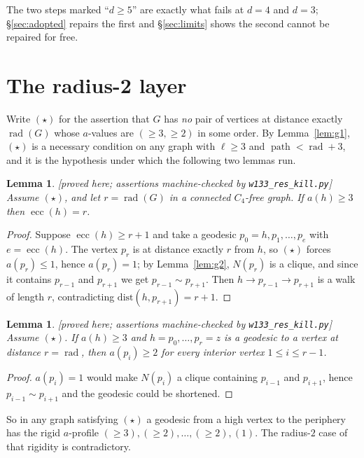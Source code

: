 \documentclass[11pt]{article}
\theoremstyle{plain}
\newtheorem{lemma}[theorem]{Lemma}
\theoremstyle{definition}
\theoremstyle{remark}
\numberwithin{equation}{section}
\newcommand{\rad}{\operatorname{rad}}
\newcommand{\ecc}{\operatorname{ecc}}
\newcommand{\pth}{\operatorname{path}}
\newcommand{\statusbox}[1]{{\small\sloppy\textsf{[#1]}}}
\newcommand{\PRV}[1]{\statusbox{proved here; assertions machine-checked by \texttt{#1}}}
\begin{document}
The two steps marked ``$d \ge 5$'' are exactly what fails at $d = 4$ and $d = 3$;
\S\ref{sec:adopted} repairs the first and \S\ref{sec:limits} shows the second cannot be
repaired for free.

\section{The radius-2 layer}\label{sec:r2}

Write $(\star)$ for the assertion that $G$ has \emph{no} pair of vertices at distance exactly
$\rad(G)$ whose $a$-values are $(\ge 3, \ge 2)$ in some order. By Lemma~\ref{lem:g1},
$(\star)$ is a necessary condition on any graph with $\ell \ge 3$ and
$\pth < \rad + 3$, and it is the hypothesis under which the following two lemmas run.

\begin{lemma}\label{lem:g4}
\PRV{w133\_res\_kill.py}
Assume $(\star)$, and let $r = \rad(G)$ in a connected $C_4$-free graph. If $a(h) \ge 3$ then
$\ecc(h) = r$.
\end{lemma}

\begin{proof}
Suppose $\ecc(h) \ge r+1$ and take a geodesic $p_0 = h, p_1, \dots, p_e$ with
$e = \ecc(h)$. The vertex $p_r$ is at distance exactly $r$ from $h$, so $(\star)$ forces
$a(p_r) \le 1$, hence $a(p_r) = 1$; by Lemma~\ref{lem:g2}, $N(p_r)$ is a clique, and since it
contains $p_{r-1}$ and $p_{r+1}$ we get $p_{r-1} \sim p_{r+1}$. Then
$h \to p_{r-1} \to p_{r+1}$ is a walk of length $r$, contradicting
$\mathrm{dist}(h,p_{r+1}) = r+1$.
\end{proof}

\begin{lemma}\label{lem:g5}
\PRV{w133\_res\_kill.py}
Assume $(\star)$. If $a(h) \ge 3$ and $h = p_0, \dots, p_r = z$ is a geodesic to a vertex at
distance $r = \rad$, then $a(p_i) \ge 2$ for every interior vertex $1 \le i \le r-1$.
\end{lemma}

\begin{proof}
$a(p_i) = 1$ would make $N(p_i)$ a clique containing $p_{i-1}$ and $p_{i+1}$, hence
$p_{i-1} \sim p_{i+1}$ and the geodesic could be shortened.
\end{proof}

So in any graph satisfying $(\star)$ a geodesic from a high vertex to the periphery has the
rigid $a$-profile $(\ge 3), (\ge 2), \dots, (\ge 2), (1)$. The radius-$2$ case of that
rigidity is contradictory.
\end{document}
